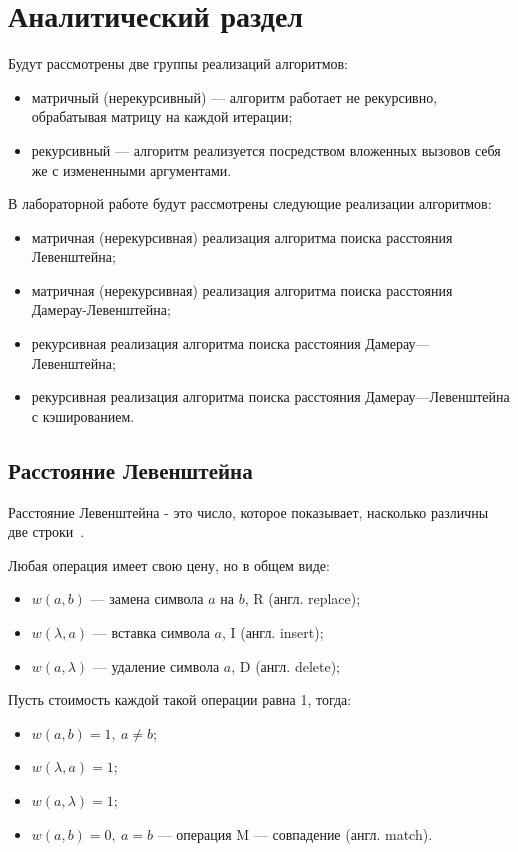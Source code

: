 \chapter{Аналитический раздел}

Будут рассмотрены две группы реализаций алгоритмов:
\begin{itemize}
	\item матричный (нерекурсивный) --- алгоритм работает не рекурсивно, обрабатывая матрицу на каждой итерации;
	\item рекурсивный --- алгоритм реализуется посредством вложенных вызовов себя же с измененными аргументами.
\end{itemize}

В лабораторной работе будут рассмотрены следующие реализации алгоритмов:
\begin{itemize}
	\item матричная (нерекурсивная) реализация алгоритма поиска расстояния Левенштейна;
	\item матричная (нерекурсивная) реализация алгоритма поиска расстояния Дамерау-Левенштейна;
	\item рекурсивная реализация алгоритма поиска расстояния Дамерау---Левенштейна;
	\item рекурсивная реализация алгоритма поиска расстояния Дамерау---Левенштейна с кэшированием.
\end{itemize}

\section{Расстояние Левенштейна}
Расстояние Левенштейна - это число, которое показывает, насколько различны две строки~\cite{definition-lev}.

Любая операция имеет свою цену, но в общем виде:
\begin{itemize}
	\item $w(a, b)$ --- замена символа $a$ на $b$, R (англ. replace);
	\item $w(\lambda, a)$ --- вставка символа $a$, I (англ. insert);
	\item $w(a, \lambda)$ --- удаление символа $a$, D (англ. delete);
\end{itemize}

Пусть стоимость каждой такой операции равна 1, тогда:
\begin{itemize}
	\item $w(a, b) = 1, \medspace a \neq b$;
	\item $w(\lambda, a) = 1$;
	\item $w(a, \lambda) = 1$;
	\item $w(a, b) = 0, \medspace a = b$ --- операция M --- совпадение (англ. match).
\end{itemize}


